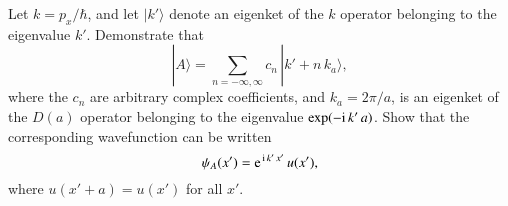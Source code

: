 \begin{enumerate}[label=\thechapter.\arabic*,leftmargin=*,widest=9.20]
 Let $k=p_x/\hbar$, and let $|k'\rangle$ denote an eigenket of the $k$ operator belonging to the eigenvalue $k'$. 
 Demonstrate that
 $$
 |A\rangle = \sum_{n=-\infty,\infty}c_n\,|k'+n\,k_a\rangle,
 $$
 where the $c_n$ are arbitrary complex coefficients, and $k_a=2\pi/a$, is an eigenket of the $D(a)$ operator
 belonging to the eigenvalue $\exp(-{\rm i}\,k'\,a)$. Show that the corresponding wavefunction can
 be written
 $$
 \psi_A(x') = {\rm e}^{\,{\rm i}\,k'\,x'}\,u(x'),
 $$
 where $u(x'+a)=u(x')$ for all $x'$. 
\end{enumerate}
 